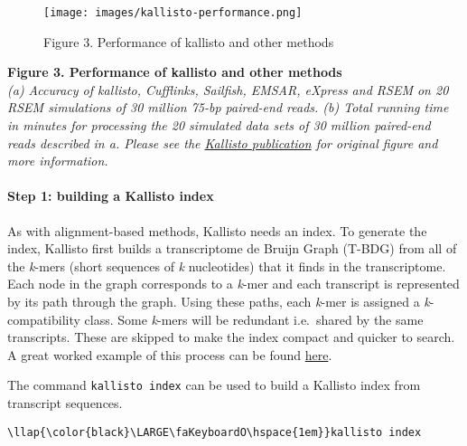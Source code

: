 \documentclass[11pt]{article}
\begin{document}
    \begin{figure}[!h]
\centering
\texttt{[image: images/kallisto-performance.png]}
\caption{Figure 3. Performance of kallisto and other methods}
\end{figure}

    \textbf{Figure 3. Performance of kallisto and other methods}\\
\textit{(a) Accuracy of kallisto, Cufflinks, Sailfish, EMSAR, eXpress and
RSEM on 20 RSEM simulations of 30 million 75-bp paired-end reads. (b)
Total running time in minutes for processing the 20 simulated data sets
of 30 million paired-end reads described in a. Please see the
\href{https://www.nature.com/articles/nbt.3519}{Kallisto publication}
for original figure and more information.}

    \hypertarget{step-1-building-a-kallisto-index}{%
\paragraph{Step 1: building a Kallisto
index}\label{step-1-building-a-kallisto-index}}

As with alignment-based methods, Kallisto needs an index. To generate
the index, Kallisto first builds a transcriptome de Bruijn Graph (T-BDG)
from all of the \textit{k}-mers (short sequences of \textit{k} nucleotides)
that it finds in the transcriptome. Each node in the graph corresponds
to a \textit{k}-mer and each transcript is represented by its path through
the graph. Using these paths, each \textit{k}-mer is assigned a
\textit{k}-compatibility class. Some \textit{k}-mers will be redundant
i.e.~shared by the same transcripts. These are skipped to make the index
compact and quicker to search. A great worked example of this process
can be found
\href{http://bioinfo.iric.ca/understanding-how-kallisto-works/}{here}.

The command \texttt{kallisto\ index} can be used to build a Kallisto
index from transcript sequences.





\begin{terminalinput}
\begin{Verbatim}[commandchars=\\\{\}]
\llap{\color{black}\LARGE\faKeyboardO\hspace{1em}}kallisto index
\end{Verbatim}
\end{terminalinput}
\end{document}
